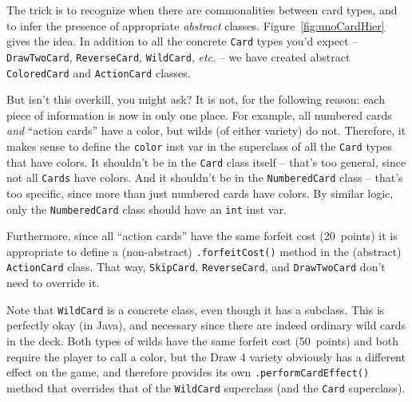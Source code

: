 
The trick is to recognize when there are commonalities between card types, and
to infer the presence of appropriate \textit{abstract} classes.
Figure~\ref{fig:unoCardHier} gives the idea. In addition to all the concrete
\texttt{Card} types you'd expect -- \texttt{DrawTwoCard}, \texttt{ReverseCard},
\texttt{WildCard}, \textit{etc.} -- we have created abstract
\texttt{ColoredCard} and \texttt{ActionCard} classes.

But isn't this overkill, you might ask? It is not, for the following reason:
each piece of information is now in only one place. For example, all numbered
cards \textit{and} ``action cards'' have a color, but wilds (of either variety)
do not. Therefore, it makes sense to define the \texttt{color} inst var in the
superclass of all the \texttt{Card} types that have colors. It shouldn't be in
the \texttt{Card} class itself -- that's too general, since not all
\texttt{Cards} have colors. And it shouldn't be in the \texttt{NumberedCard}
class -- that's too specific, since more than just numbered cards have colors.
By similar logic, only the \texttt{NumberedCard} class should have an
\texttt{int} inst var.


Furthermore, since all ``action cards'' have the same forfeit cost (20~points)
it is appropriate to define a (non-abstract) \texttt{.forfeitCost()} method in
the (abstract) \texttt{ActionCard} class. That way, \texttt{SkipCard},
\texttt{ReverseCard}, and \texttt{DrawTwoCard} don't need to override it.


Note that \texttt{WildCard} is a concrete class, even though it has a subclass.
This is perfectly okay (in Java), and necessary since there are indeed ordinary
wild cards in the deck. Both types of wilds have the same forfeit cost
(50~points) and both require the player to call a color, but the Draw 4 variety
obviously has a different effect on the game, and therefore provides its own
\texttt{.performCardEffect()} method that overrides that of the
\texttt{WildCard} superclass (and the \texttt{Card} superclass).


